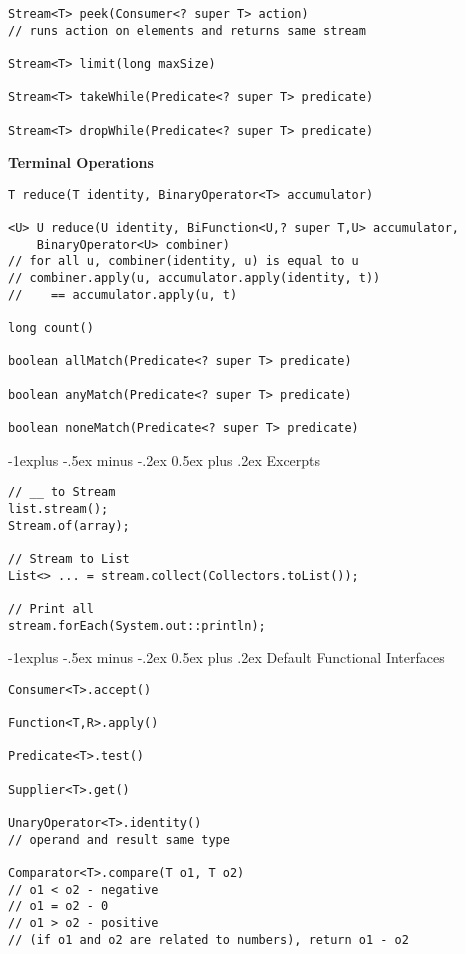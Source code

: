 \documentclass[10pt, landscape]{article}
\makeatletter
\renewcommand{\subsection}{\@startsection{subsection}{2}{0mm}%
                                {-1explus -.5ex minus -.2ex}%
                                {0.5ex plus .2ex}%
                                {\normalfont\normalsize\bfseries}}
\makeatother
\begin{document}
\begin{multicols}{2}
\begin{verbatim}
Stream<T> peek(Consumer<? super T> action)
// runs action on elements and returns same stream

Stream<T> limit(long maxSize)

Stream<T> takeWhile(Predicate<? super T> predicate)

Stream<T> dropWhile(Predicate<? super T> predicate)

\end{verbatim}

\textbf{Terminal Operations}
\begin{verbatim}
T reduce(T identity, BinaryOperator<T> accumulator)

<U> U reduce(U identity, BiFunction<U,? super T,U> accumulator, 
    BinaryOperator<U> combiner)
// for all u, combiner(identity, u) is equal to u
// combiner.apply(u, accumulator.apply(identity, t)) 
//    == accumulator.apply(u, t)

long count()

boolean allMatch(Predicate<? super T> predicate)

boolean anyMatch(Predicate<? super T> predicate)

boolean noneMatch(Predicate<? super T> predicate)
\end{verbatim}

\columnbreak

\subsection{Excerpts}
\begin{verbatim}
// __ to Stream
list.stream();
Stream.of(array);

// Stream to List
List<> ... = stream.collect(Collectors.toList());

// Print all
stream.forEach(System.out::println);
\end{verbatim}

\subsection{Default Functional Interfaces}

\begin{verbatim}
Consumer<T>.accept()

Function<T,R>.apply()

Predicate<T>.test()

Supplier<T>.get()

UnaryOperator<T>.identity()
// operand and result same type

Comparator<T>.compare(T o1, T o2)
// o1 < o2 - negative
// o1 = o2 - 0
// o1 > o2 - positive
// (if o1 and o2 are related to numbers), return o1 - o2
\end{verbatim}


\end{multicols}
\end{document}
